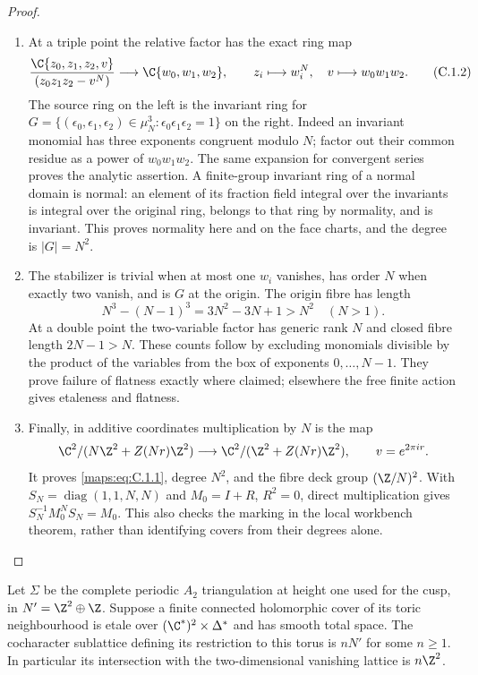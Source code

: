 \begin{proof}
\begin{enumerate}[label=\arabic*.,leftmargin=*]
\item At a triple point the relative factor has the exact ring map
\[
 \frac{\C\{z_0,z_1,z_2,v\}}{(z_0z_1z_2-v^N)}
 \longrightarrow\C\{w_0,w_1,w_2\},\qquad
 z_i\longmapsto w_i^N,\quad v\longmapsto w_0w_1w_2.
 \tag{C.1.2}\label{maps:eq:C.1.2}
\]
The source ring on the left is the invariant ring for
$G=\{(\epsilon_0,\epsilon_1,\epsilon_2)\in\mu_N^3:
\epsilon_0\epsilon_1\epsilon_2=1\}$ on the right. Indeed an invariant
monomial has three exponents congruent modulo $N$; factor out their
common residue as a power of $w_0w_1w_2$. The same expansion for convergent
series proves the analytic assertion. A finite-group invariant ring of a
normal domain is normal: an element of its fraction field integral over
the invariants is integral over the original ring, belongs to that ring
by normality, and is invariant. This proves normality here and on the
face charts, and the degree is $|G|=N^2$.

\item The stabilizer is trivial when at most one $w_i$ vanishes, has order $N$
when exactly two vanish, and is $G$ at the origin. The origin fibre has
length
\[
 N^3-(N-1)^3=3N^2-3N+1>N^2\quad(N>1).
\]
At a double point the two-variable factor has generic rank $N$ and
closed fibre length $2N-1>N$. These counts follow by excluding monomials
divisible by the product of the variables from the box of exponents
$0,\ldots,N-1$. They prove failure of flatness exactly where claimed;
elsewhere the free finite action gives etaleness and flatness.

\item Finally, in additive coordinates multiplication by $N$ is the map
\[
 \C^2/(N\Z^2+Z(Nr)\Z^2)\longrightarrow
 \C^2/(\Z^2+Z(Nr)\Z^2),\qquad v=e^{2\pi ir}.
\]
It proves \eqref{maps:eq:C.1.1}, degree $N^2$, and the fibre deck group
$(\Z/N)^2$. With $S_N=\operatorname{diag}(1,1,N,N)$ and
$M_0=I+R$, $R^2=0$, direct multiplication gives
$S_N^{-1}M_0^NS_N=M_0$. This also checks the marking in the local
workbench theorem, rather than identifying covers from their degrees
alone.
\end{enumerate}
\end{proof}

\begin{lemma}\label{maps:src:C.1.2}


Let $\Sigma$ be the complete periodic $A_2$ triangulation at height one
used for the cusp, in $N'=\Z^2\oplus\Z$. Suppose a finite connected
holomorphic cover of its toric neighbourhood is etale over
$(\C^*)^2\times\Delta^*$ and has smooth total space. The cocharacter
sublattice defining its restriction to this torus is $nN'$ for some
$n\geq1$. In particular its intersection with the two-dimensional
vanishing lattice is $n\Z^2$.

\end{lemma}


